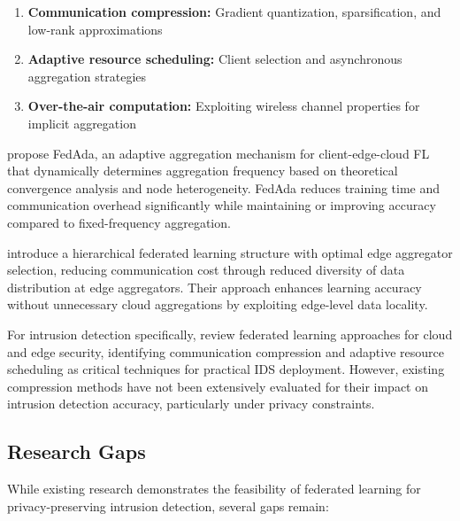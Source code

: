 \begin{enumerate}
    \item \textbf{Communication compression:} Gradient quantization, sparsification, and low-rank approximations
    \item \textbf{Adaptive resource scheduling:} Client selection and asynchronous aggregation strategies
    \item \textbf{Over-the-air computation:} Exploiting wireless channel properties for implicit aggregation
\end{enumerate}

\citet{luo2024communication} propose FedAda, an adaptive aggregation mechanism for client-edge-cloud FL that dynamically determines aggregation frequency based on theoretical convergence analysis and node heterogeneity. FedAda reduces training time and communication overhead significantly while maintaining or improving accuracy compared to fixed-frequency aggregation.

\citet{deng2024communication} introduce a hierarchical federated learning structure with optimal edge aggregator selection, reducing communication cost through reduced diversity of data distribution at edge aggregators. Their approach enhances learning accuracy without unnecessary cloud aggregations by exploiting edge-level data locality.

For intrusion detection specifically, \citet{albshaier2025federated} review federated learning approaches for cloud and edge security, identifying communication compression and adaptive resource scheduling as critical techniques for practical IDS deployment. However, existing compression methods have not been extensively evaluated for their impact on intrusion detection accuracy, particularly under privacy constraints.

\subsection{Research Gaps}

While existing research demonstrates the feasibility of federated learning for privacy-preserving intrusion detection, several gaps remain:

